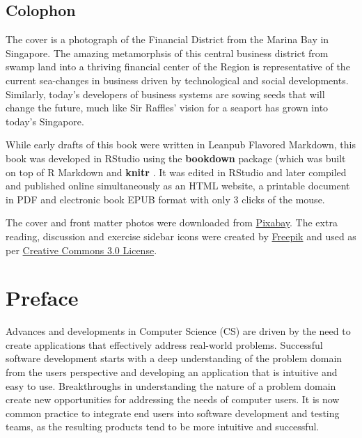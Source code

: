 \documentclass[]{book}
\begin{document}
\hypertarget{colophon}{%
\section*{Colophon}\label{colophon}}

The cover is a photograph of the Financial District from the Marina Bay in Singapore. The amazing metamorphsis of this central business district from swamp land into a thriving financial center of the Region is representative of the current sea-changes in business driven by technological and social developments. Similarly, today's developers of business systems are sowing seeds that will change the future, much like Sir Raffles' vision for a seaport has grown into today's Singapore.

While early drafts of this book were written in Leanpub Flavored Markdown, this book was developed in RStudio using the \textbf{bookdown} package \citep{R-bookdown} (which was built on top of R Markdown and \textbf{knitr} \citep{Xie2015}. It was edited in RStudio and later compiled and published online simultaneously as an HTML website, a printable document in PDF and electronic book EPUB format with only 3 clicks of the mouse.

The cover and front matter photos were downloaded from \href{https://pixabay.com/images/search/singapore}{Pixabay}.
The extra reading, discussion and exercise sidebar icons were created by \href{https://www.freepik.com}{Freepik} and used as per \href{https://creativecommons.org/licenses/by/3.0}{Creative Commons 3.0 License}.

\hypertarget{preface}{%
\chapter*{Preface}\label{preface}}

Advances and developments in Computer Science (CS) are driven by the need to create applications that effectively address real-world problems. Successful software development starts with a deep understanding of the problem domain from the users perspective and developing an application that is intuitive and easy to use. Breakthroughs in understanding the nature of a problem domain create new opportunities for addressing the needs of computer users. It is now common practice to integrate end users into software development and testing teams, as the resulting products tend to be more intuitive and successful.
\end{document}

